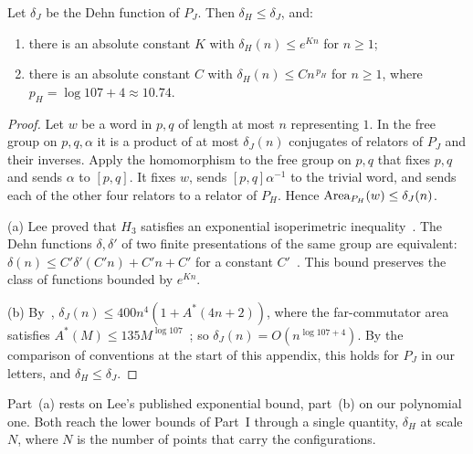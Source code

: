 \begin{proposition}\label{prop:dehn}
Let $\delta_J$ be the Dehn function of $P_J$. Then $\delta_H\le\delta_J$, and:
\begin{enumerate}[label=(\alph*),itemsep=1pt]
\item there is an absolute constant $K$ with $\delta_H(n)\le e^{Kn}$ for $n\ge1$;
\item there is an absolute constant $C$ with $\delta_H(n)\le Cn^{\,p_H}$ for $n\ge1$, where $p_H=\log107+4\approx10.74$.
\end{enumerate}
\end{proposition}

\begin{proof}
Let $w$ be a word in $p,q$ of length at most $n$ representing $1$. In the free group on $p,q,\alpha$ it is a product of at most $\delta_J(n)$
conjugates of relators of $P_J$ and their inverses. Apply the homomorphism to the free group on $p,q$ that fixes $p,q$ and sends $\alpha$ to
$[p,q]$. It fixes $w$, sends $[p,q]\alpha^{-1}$ to the trivial word, and sends each of the other four relators to a relator of $P_H$. Hence
$\operatorname{Area}_{P_H}(w)\le\delta_J(n)$.

(a) Lee proved that $H_3$ satisfies an exponential isoperimetric inequality~\cite[Theorem~D]{Lee2012}. The Dehn functions $\delta,\delta'$ of two finite
presentations of the same group are equivalent: $\delta(n)\le C'\delta'(C'n)+C'n+C'$ for a constant $C'$~\cite{Bridson2002}. This bound
preserves the class of functions bounded by $e^{Kn}$.

(b) By~\cite[Theorem~3.3]{DouglasMghirbiA}, $\delta_J(n)\le400n^4(1+A^*(4n+2))$, where the far-commutator area satisfies
$A^*(M)\le135M^{\log107}$~\cite[Theorem~3.2]{DouglasMghirbiA}; so $\delta_J(n)=O(n^{\log107+4})$. By the comparison of conventions at the start
of this appendix, this holds for $P_J$ in our letters, and $\delta_H\le\delta_J$.
\end{proof}

Part~(a) rests on Lee's published exponential bound, part~(b) on our polynomial one. Both reach the lower bounds of Part~I through a single
quantity, $\delta_H$ at scale $N$, where $N$ is the number of points that carry the configurations.
